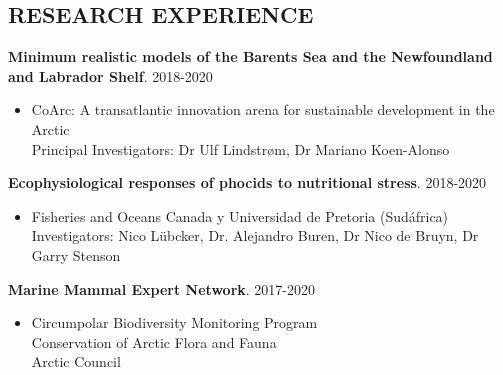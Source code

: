 \documentclass{res}
\begin{document}
\begin{resume}
\section{RESEARCH EXPERIENCE}
\vspace{0.1in}

{\bf Minimum realistic models of the Barents Sea and the Newfoundland and Labrador Shelf}. 2018-2020
\begin{itemize} %
	\item[] CoArc: A transatlantic innovation arena for sustainable development in the Arctic\\
	Principal Investigators: Dr Ulf Lindstr{\o}m, Dr Mariano Koen-Alonso
\end{itemize}

{\bf Ecophysiological responses of phocids to nutritional stress}. 2018-2020
\begin{itemize} %
	\item[] Fisheries and Oceans Canada y Universidad de Pretoria (Sudáfrica)\\
	Investigators: Nico L\"ubcker, Dr. Alejandro Buren, Dr Nico de Bruyn, Dr Garry Stenson
\end{itemize}

{\bf Marine Mammal Expert Network}. 2017-2020
\begin{itemize} %
	\item[] Circumpolar Biodiversity Monitoring Program\\
	Conservation of Arctic Flora and Fauna\\
	Arctic Council
\end{itemize}


\end{resume}
\end{document}
